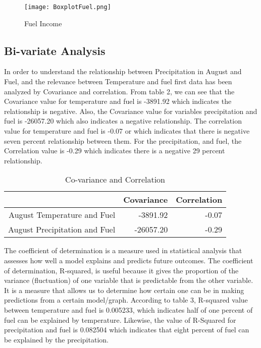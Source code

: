 \documentclass[12pt, a4]{article}
\begin{document}
\begin{figure}[H]
\texttt{[image: BoxplotFuel.png]}
\caption{Fuel Income}
\end{figure}




\subsection{Bi-variate Analysis}

In order to understand the relationship between Precipitation in August and Fuel, and the relevance between Temperature and fuel first data has been analyzed by Covariance and correlation. From table 2, we can see that the Covariance value for temperature and fuel is -3891.92 which indicates the relationship is negative. Also, the Covariance value for variables precipitation and fuel is -26057.20 which also indicates a negative relationship. The correlation value for temperature and fuel is -0.07 or which indicates that there is negative seven percent relationship between them. For the precipitation, and fuel, the Correlation value is -0.29 which indicates there is a negative 29 percent relationship. 
 
\begin{table}[H]

\centering
\caption{\label{tab:table-name} Co-variance and Correlation}
\begin{tabular}{rrr}
  \hline
 & Covariance & Correlation \\ 
  \hline
August Temperature and Fuel & -3891.92 & -0.07 \\ 
 August Precipitation and Fuel & -26057.20 & -0.29 \\ 
   \hline
\end{tabular}
\end{table}

The coefficient of determination is a measure used in statistical analysis that assesses how well a model explains and predicts future outcomes. The coefficient of determination, R-squared, is useful because it gives the proportion of the variance (fluctuation) of one variable that is predictable from the other variable. It is a measure that allows us to determine how certain one can be in making predictions from a certain model/graph. 
According to table 3, R-squared value between temperature and fuel is 0.005233, which indicates half of one percent of fuel can be explained by temperature. Likewise, the value of R-Squared for precipitation and fuel is 0.082504 which indicates that eight percent of fuel can be explained by the precipitation. 
\end{document}
